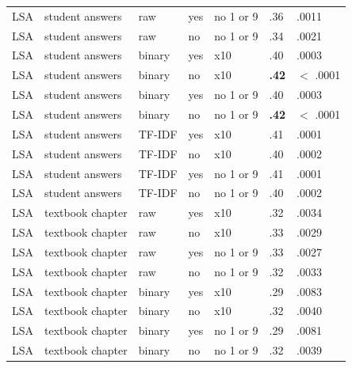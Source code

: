\documentclass[a4paper,10pt,twoside]{article}
\begin{document}
\begin{table}[h]
\begin{tabular}{lllllll}
		LSA        & student answers    & raw             & yes                 & no 1 or 9         & .36 & .0011       \\
		LSA        & student answers    & raw             & no                  & no 1 or 9         & .34 & .0021       \\
		LSA        & student answers    & binary          & yes                 & x10               & .40 & .0003       \\
		LSA        & student answers    & binary          & no                  & x10               & \textbf{.42} & $<$ .0001       \\
		LSA        & student answers    & binary          & yes                 & no 1 or 9         & .40 & .0003       \\
		LSA        & student answers    & binary          & no                  & no 1 or 9         & \textbf{.42} & $<$ .0001       \\
		LSA        & student answers    & TF-IDF          & yes                 & x10               & .41 & .0001       \\
		LSA        & student answers    & TF-IDF          & no                  & x10               & .40 & .0002       \\
		LSA        & student answers    & TF-IDF          & yes                 & no 1 or 9         & .41 & .0001       \\
		LSA        & student answers    & TF-IDF          & no                  & no 1 or 9         & .40 & .0002       \\
		LSA        & textbook chapter   & raw             & yes                 & x10               & .32 & .0034       \\
		LSA        & textbook chapter   & raw             & no                  & x10               & .33 & .0029       \\
		LSA        & textbook chapter   & raw             & yes                 & no 1 or 9         & .33 & .0027       \\
		LSA        & textbook chapter   & raw             & no                  & no 1 or 9         & .32 & .0033       \\
		LSA        & textbook chapter   & binary          & yes                 & x10               & .29 & .0083       \\
		LSA        & textbook chapter   & binary          & no                  & x10               & .32 & .0040       \\
		LSA        & textbook chapter   & binary          & yes                 & no 1 or 9         & .29 & .0081       \\
		LSA        & textbook chapter   & binary          & no                  & no 1 or 9         & .32 & .0039 \\
		\hline     
	\end{tabular}
\end{table}
\end{document}
